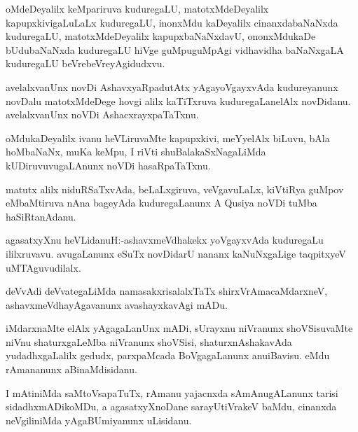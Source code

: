 \documentclass{article}
\begin{document}
\begin{mn}%
oMdeDeyalilx keMpariruva kuduregaLU, matotxMdeDeyalilx kapupxkivigaLuLaLx kuduregaLU, 
inonxMdu kaDeyalilx cinanxdabaNaNxda kuduregaLU, matotxMdeDeyalilx kapupxbaNaNxdavU, 
ononxMdukaDe bUdubaNaNxda kuduregaLU hiVge guMpuguMpAgi vidhavidha baNaNxgaLA kuduregaLU 
beVrebeVreyAgidudxvu.
\end{mn}

\begin{mn}%
avelalxvanUnx novDi AshavxyaRpadutAtx yAgayoVgayxvAda kudureyanunx novDalu matotxMdeDege 
hovgi alilx kaTiTxruva kuduregaLanelAlx novDidanu. avelalxvanUnx noVDi AshacxrayxpaTaTxnu.
\end{mn}

\begin{mn}%
oMdukaDeyalilx ivanu heVLiruvaMte kapupxkivi, meYyelAlx biLuvu, bAla hoMbaNaNx, muKa 
keMpu, I riVti shuBalakaSxNagaLiMda kUDiruvuvugaLAnunx noVDi hasaRpaTaTxnu.
\end{mn}

\begin{mn}%
matutx alilx niduRSaTxvAda, beLaLxgiruva, veVgavuLaLx, kiVtiRya guMpov eMbaMtiruva nAna 
bageyAda kuduregaLanunx A Qusiya noVDi tuMba haSiRtanAdanu. 
\end{mn}

\begin{mn}%
agasatxyXnu heVLidanuH:-ashavxmeVdhakekx yoVgayxvAda kuduregaLu ililxruvavu. avugaLanunx 
eSuTx novDidarU nananx kaNuNxgaLige taqpitxyeV uMTAguvudilalx.
\end{mn}

\begin{mn}%
deVvAdi deVvategaLiMda namasakxrisalalxTaTx shirxVrAmacaMdarxneV, ashavxmeVdhayAgavanunx 
avashayxkavAgi mADu.
\end{mn}

\begin{mn}%
iMdarxnaMte elAlx yAgagaLanUnx mADi, sUrayxnu niVranunx shoVSisuvaMte niVnu shaturxgaLeMba 
niVranunx shoVSisi, shaturxnAshakavAda yudadhxgaLalilx gedudx, parxpaMcada BoVgagaLanunx 
anuiBavisu. eMdu rAmananunx aBinaMdisidanu.
\end{mn}

\begin{mn}%
I mAtiniMda saMtoVsapaTuTx, rAmanu yajacnxda sAmAnugALanunx tarisi sidadhxmADikoMDu, a 
agasatxyXnoDane sarayUtiVrakeV baMdu, cinanxda neVgiliniMda yAgaBUmiyanunx uLisidanu.
\end{mn}
\end{document}
